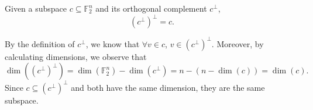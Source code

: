 \begin{lemma}\label{complement_of_orthogonal_complement}
Given a subspace $c \subseteq \mathbb{F}^n_2$ and its orthogonal complement $c^\perp$,
\begin{equation}
(c^\perp)^\perp = c.
\end{equation}

By the definition of $c^\perp$, we know that $\forall v \in c$, $v \in (c^\perp)^\perp$. Moreover, by calculating dimensions, we observe that
\begin{equation}
\dim((c^\perp)^\perp) = \dim(\mathbb{F}^n_2) - \dim(c^\perp) = n - (n - \dim(c)) = \dim(c).
\end{equation}
Since $c \subseteq (c^\perp)^\perp$ and both have the same dimension, they are the same subspace.
\end{lemma}

